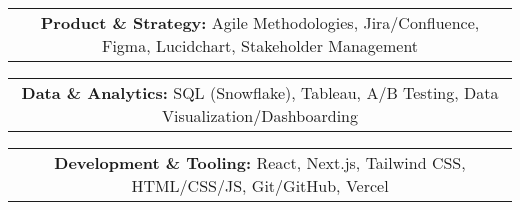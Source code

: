 \documentclass[a4paper,8pt]{article}
\begin{document}
\noindent \normalsize 

\vspace{1mm}

\noindent\begin{tabular}{c}
\noindent\normalsize\textbf{Product \& Strategy:} Agile Methodologies, Jira/Confluence, Figma, Lucidchart, Stakeholder Management
\end{tabular}

\vspace{1mm} 

\noindent\begin{tabular}{c}
\noindent \normalsize\textbf{Data \& Analytics:} SQL (Snowflake), Tableau, A/B Testing, Data Visualization/Dashboarding
\end{tabular}

 \vspace{1mm}

\noindent\begin{tabular}{c}
\noindent \normalsize\textbf{Development \& Tooling:} React, Next.js, Tailwind CSS,  HTML/CSS/JS, Git/GitHub, Vercel
\end{tabular}









%
\end{document}
